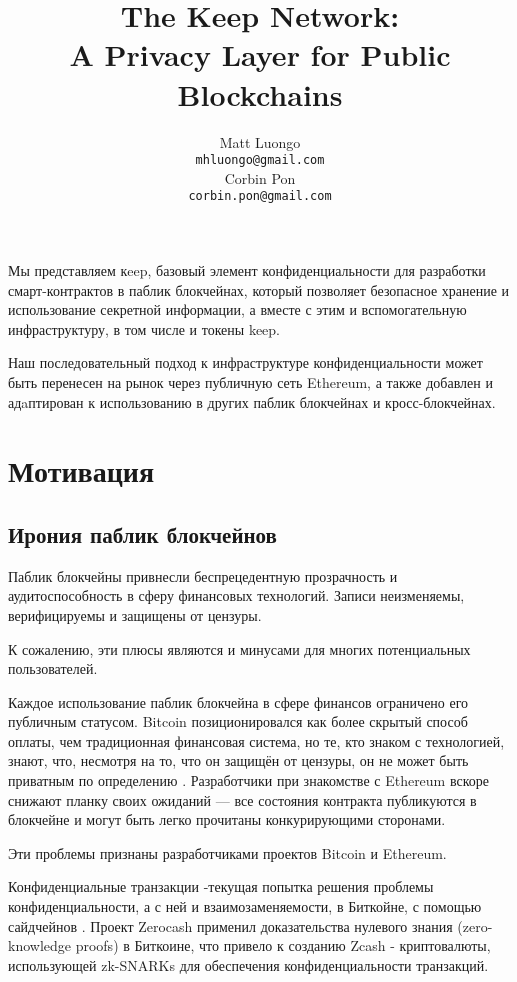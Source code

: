 \documentclass[11pt]{article}
\title{The Keep Network:\protect\\A Privacy Layer for Public Blockchains}
\author{Matt Luongo \\
  {\tt mhluongo@gmail.com} \\\And
  Corbin Pon \\
  {\tt corbin.pon@gmail.com} \\}
\date{}
\begin{document}
\thispagestyle{fancy}

\maketitle

\begin{Резюме}

  Мы представляем кeep, базовый элемент конфиденциальности 
  для разработки смарт-контрактов в паблик блокчейнах, который 
  позволяет безопасное хранение и использование секретной 
  информации, а вместе с этим и вспомогательную  инфраструктуру, 
  в том числе и токены keep.

  Наш последовательный подход к инфраструктуре конфиденциальности 
  может быть перенесен на рынок через публичную сеть Ethereum, 
  а также добавлен и адaптирован к использованию в других 
  паблик блокчейнах и кросс-блокчейнах.

\end{Резюме}

\section{Мотивация}

\subsection{Ирония паблик блокчейнов}

Паблик блокчейны привнесли беспрецедентную прозрачность и 
аудитоспособность в сферу финансовых технологий. 
Записи неизменяемы, верифицируемы и защищены от цензуры.

К сожалению, эти плюсы являются и минусами для многих потенциальных 
пользователей. 

Каждое использование паблик блокчейна в сфере финансов ограничено 
его публичным статусом. Bitcoin позиционировался как более скрытый 
способ оплаты, чем традиционная финансовая система, но те, кто 
знаком с технологией, знают, что, несмотря на то, что он защищён 
от цензуры, он не может быть приватным по определению \cite{bitcoinPrivacy}. 
Разработчики при знакомстве с Ethereum вскоре снижают планку своих 
ожиданий \cite{ethereumStackexchange}— все состояния контракта 
публикуются в блокчейне и могут быть легко прочитаны конкурирующими 
сторонами.

Эти проблемы признаны разработчиками проектов Bitcoin и Ethereum.

Конфиденциальные транзакции \cite{confidentialTransactions}-текущая 
попытка решения проблемы конфиденциальности, а с ней и 
взаимозаменяемости, в Биткойне, с помощью сайдчейнов \cite{confidentialTransactionsElements}. 
Проект Zerocash \cite{zerocash} применил доказательства нулевого 
знания (zero-knowledge proofs) в Биткоине, что привело к созданию 
Zcash \cite{zcash}- криптовалюты, использующей zk-SNARKs для 
обеспечения конфиденциальности транзакций.
\end{document}
